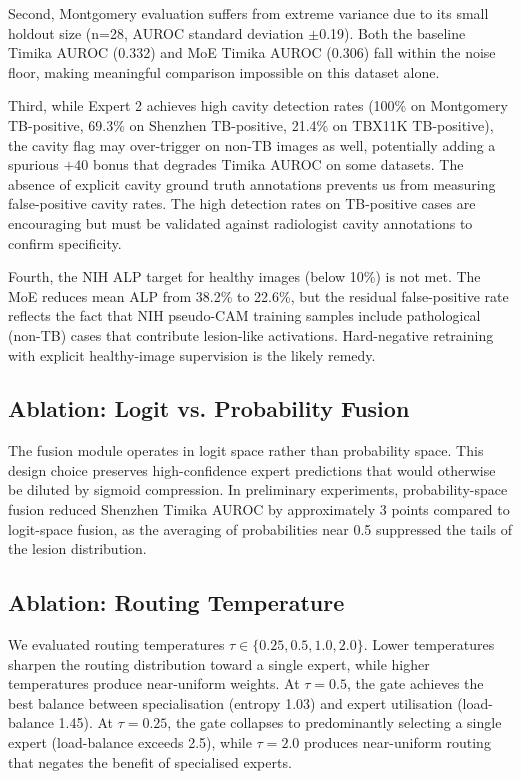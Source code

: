 \documentclass{article}
\begin{document}
Second, Montgomery evaluation suffers from extreme variance due to its small holdout size (n=28, AUROC standard deviation $\pm$0.19). Both the baseline Timika AUROC (0.332) and MoE Timika AUROC (0.306) fall within the noise floor, making meaningful comparison impossible on this dataset alone.

Third, while Expert 2 achieves high cavity detection rates (100\% on Montgomery TB-positive, 69.3\% on Shenzhen TB-positive, 21.4\% on TBX11K TB-positive), the cavity flag may over-trigger on non-TB images as well, potentially adding a spurious $+40$ bonus that degrades Timika AUROC on some datasets. The absence of explicit cavity ground truth annotations prevents us from measuring false-positive cavity rates. The high detection rates on TB-positive cases are encouraging but must be validated against radiologist cavity annotations to confirm specificity.

Fourth, the NIH ALP target for healthy images (below 10\%) is not met. The MoE reduces mean ALP from 38.2\% to 22.6\%, but the residual false-positive rate reflects the fact that NIH pseudo-CAM training samples include pathological (non-TB) cases that contribute lesion-like activations. Hard-negative retraining with explicit healthy-image supervision is the likely remedy.

\subsection{Ablation: Logit vs. Probability Fusion}

The fusion module operates in logit space rather than probability space. This design choice preserves high-confidence expert predictions that would otherwise be diluted by sigmoid compression. In preliminary experiments, probability-space fusion reduced Shenzhen Timika AUROC by approximately 3 points compared to logit-space fusion, as the averaging of probabilities near 0.5 suppressed the tails of the lesion distribution.

\subsection{Ablation: Routing Temperature}

We evaluated routing temperatures $\tau \in \{0.25, 0.5, 1.0, 2.0\}$. Lower temperatures sharpen the routing distribution toward a single expert, while higher temperatures produce near-uniform weights. At $\tau = 0.5$, the gate achieves the best balance between specialisation (entropy 1.03) and expert utilisation (load-balance 1.45). At $\tau = 0.25$, the gate collapses to predominantly selecting a single expert (load-balance exceeds 2.5), while $\tau = 2.0$ produces near-uniform routing that negates the benefit of specialised experts.
\end{document}
